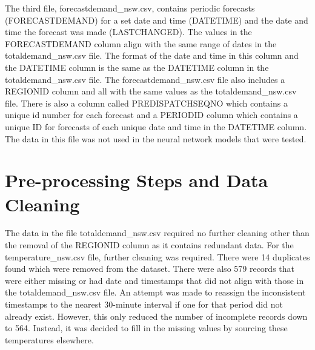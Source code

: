\documentclass[mstat,12pt]{unswthesis}
\begin{document}
\bigskip

The third file, forecastdemand\_nsw.csv, contains periodic forecasts
(FORECASTDEMAND) for a set date and time (DATETIME) and the date and
time the forecast was made (LASTCHANGED). The values in the
FORECASTDEMAND column align with the same range of dates in the
totaldemand\_nsw.csv file. The format of the date and time in this
column and the DATETIME column is the same as the DATETIME column in the
totaldemand\_nsw.csv file. The forecastdemand\_nsw.csv file also
includes a REGIONID column and all with the same values as the
totaldemand\_nsw.csv file. There is also a column called
PREDISPATCHSEQNO which contains a unique id number for each forecast and
a PERIODID column which contains a unique ID for forecasts of each
unique date and time in the DATETIME column. The data in this file was
not used in the neural network models that were tested.

\hypertarget{pre-processing-steps-and-data-cleaning}{%
\section{Pre-processing Steps and Data
Cleaning}\label{pre-processing-steps-and-data-cleaning}}

The data in the file totaldemand\_nsw.csv required no further cleaning
other than the removal of the REGIONID column as it contains redundant
data. For the temperature\_nsw.csv file, further cleaning was required.
There were 14 duplicates found which were removed from the dataset.
There were also 579 records that were either missing or had date and
timestamps that did not align with those in the totaldemand\_nsw.csv
file. An attempt was made to reassign the inconsistent timestamps to the
nearest 30-minute interval if one for that period did not already exist.
However, this only reduced the number of incomplete records down to 564.
Instead, it was decided to fill in the missing values by sourcing these
temperatures elsewhere.

\bigskip
\end{document}
